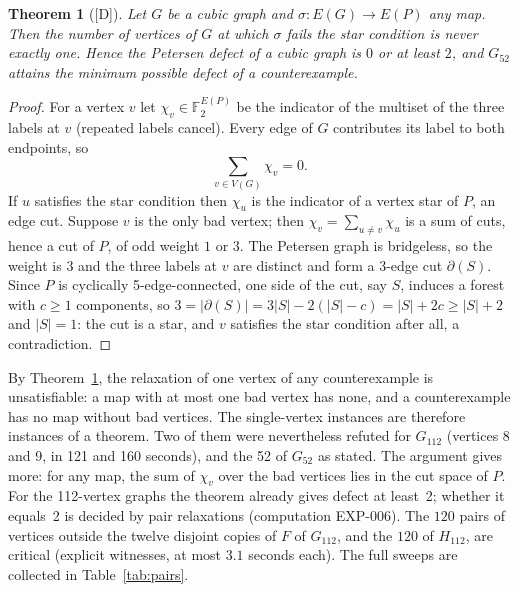 \documentclass[11pt]{article}
\newtheorem{theorem}{Theorem}[section]
\theoremstyle{definition}
\theoremstyle{remark}
\newcommand{\PG}{P}
\newcommand{\Gmain}{G_{112}}
\newcommand{\Gsym}{H_{112}}
\newcommand{\Gfty}{G_{52}}
\newcommand{\dd}{\textup{[D]}}
\begin{document}
\begin{theorem}[\dd]\label{thm:parity}
Let $G$ be a cubic graph and $\sigma : E(G) \to E(\PG)$ any map. Then the number of vertices of
$G$ at which $\sigma$ fails the star condition is never exactly one. Hence the Petersen defect
of a cubic graph is $0$ or at least $2$, and $\Gfty$ attains the minimum possible defect of a
counterexample.
\end{theorem}

\begin{proof}
For a vertex $v$ let $\chi_v \in \mathbb F_2^{E(\PG)}$ be the indicator of the multiset of the
three labels at $v$ (repeated labels cancel). Every edge of $G$ contributes its label to both
endpoints, so
\begin{equation}\label{eq:gauss}
\sum_{v \in V(G)} \chi_v = 0 .
\end{equation}
If $u$ satisfies the star condition then $\chi_u$ is the
indicator of a vertex star of $\PG$, an edge cut. Suppose $v$ is the only bad vertex; then
$\chi_v = \sum_{u \ne v} \chi_u$ is a sum of cuts, hence a cut of $\PG$, of odd weight $1$ or
$3$. The Petersen graph is bridgeless, so the weight is $3$ and the three labels at $v$ are
distinct and form a 3-edge cut $\partial(S)$. Since $\PG$ is cyclically 5-edge-connected, one
side of the cut, say $S$, induces a forest with $c \ge 1$ components, so $3 = |\partial(S)| =
3|S| - 2(|S| - c) = |S| + 2c \ge |S| + 2$ and $|S| = 1$: the cut is a star, and $v$ satisfies
the star condition after all, a contradiction.
\end{proof}

By Theorem~\ref{thm:parity}, the relaxation of one vertex of any counterexample is unsatisfiable:
a map with at most one bad vertex has none, and a counterexample has no map without bad vertices.
The single-vertex instances are therefore instances of a theorem. Two of them were nevertheless
refuted for $\Gmain$ (vertices 8 and 9, in 121 and 160 seconds), and the 52 of $\Gfty$ as stated.
The argument gives more: for any map, the sum of $\chi_v$ over the bad vertices lies in the cut
space of $\PG$. For the 112-vertex graphs the theorem already gives defect at least~2; whether it
equals~2 is decided by pair relaxations (computation EXP-006). The $120$ pairs of vertices
outside the twelve disjoint copies of $F$ of $\Gmain$, and the $120$ of $\Gsym$, are critical
(explicit witnesses, at most $3.1$ seconds each). The full sweeps are collected in
Table~\ref{tab:pairs}.

\begin{table}[htbp]\centering\footnotesize\setlength{\tabcolsep}{3pt}

\caption{Pair-relaxation sweeps. U: refuted with a checked proof. Every pair instance is
satisfiable and every witness has exactly the two relaxed vertices bad. Times are solver seconds
from the archived manifests (computations EXP-006 and EXP-008).}\label{tab:pairs}
\end{table}
\end{document}
